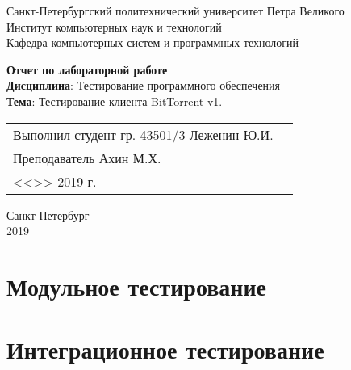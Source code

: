 \documentclass[a4paper,14pt]{extarticle}
\begin{document}
    \begin{titlepage}
        \centering
        Санкт-Петербургский политехнический университет Петра Великого \\
        Институт компьютерных наук и технологий \\
        Кафедра компьютерных систем и программных технологий \\
        \vspace{5.5cm}

        {\centering \textbf{Отчет по лабораторной работе} \\
        \vspace{0.15cm}
        \textbf{Дисциплина}: Тестирование программного обеспечения  \\
        \vspace{0.15cm}
        \textbf{Тема}: Тестирование клиента BitTorrent v1.} \\

        \vspace{5.5cm}

        \begin{table}[H]
            \begin{tabular}{p{\textwidth}@{}r}
            {Выполнил студент гр. 43501/3} \hfill
            \vspace{0.2cm}
            Леженин Ю.И. \\ \vspace{0.2cm}
            Преподаватель \hfill
            \vspace{0.2cm}
            Ахин М.Х. \\
            \vspace{0.4cm}
            {} \hfill { <<\underline{\hspace{0.08\textwidth}}>> \underline{\hspace{0.2\textwidth}}2019 г.} \\
            \end{tabular}
        \end{table}
        \vfill
        {\centering Санкт-Петербург \\
        \vspace{0.15cm}
        2019}
    \end{titlepage}

    \section{Модульное тестирование}\label{sec:unit-test}

    \section{Интеграционное тестирование}\label{sec:int-test}
\end{document}
